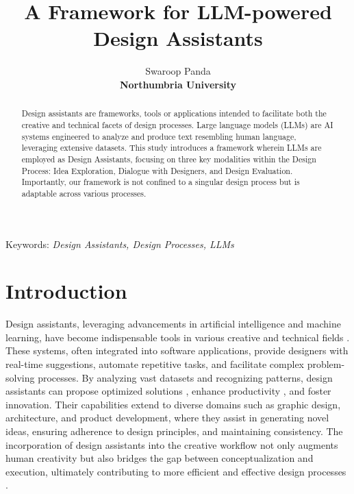 \documentclass{article}
\title{A Framework for LLM-powered Design Assistants}
\author{Swaroop Panda \\ \small\textbf{Northumbria University}}
\date{}
\begin{document}
\maketitle
\begin{abstract}
    Design assistants are frameworks, tools or applications intended to facilitate both the creative and technical facets of design processes. Large language models (LLMs) are AI systems engineered to analyze and produce text resembling human language, leveraging extensive datasets. This study introduces a framework wherein LLMs are employed as Design Assistants, focusing on three key modalities within the Design Process: Idea Exploration, Dialogue with Designers, and Design Evaluation. Importantly, our framework is not confined to a singular design process but is adaptable across various processes. 
\end{abstract}

Keywords: \textit{Design Assistants, Design Processes, LLMs}

\section{Introduction}
Design assistants, leveraging advancements in artificial intelligence and machine learning, have become indispensable tools in various creative and technical fields \cite{kim2019ai,lee2020guicomp,huet2021context}. These systems, often integrated into software applications, provide designers with real-time suggestions, automate repetitive tasks, and facilitate complex problem-solving processes. By analyzing vast datasets and recognizing patterns, design assistants can propose optimized solutions \cite{koyama2022bo}, enhance productivity \cite{huet2021context}, and foster innovation. Their capabilities extend to diverse domains such as graphic design, architecture, and product development, where they assist in generating novel ideas, ensuring adherence to design principles, and maintaining consistency. The incorporation of design assistants into the creative workflow not only augments human creativity but also bridges the gap between conceptualization and execution, ultimately contributing to more efficient and effective design processes \cite{lee2020guicomp,huet2021context}.
\end{document}
